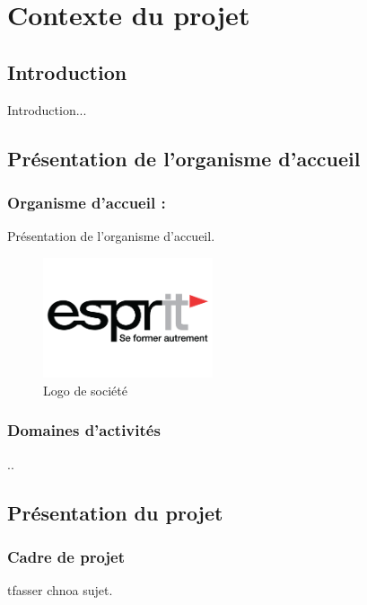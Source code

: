 
\chapter{Contexte du projet}


\setcounter{chapter}{1}
\minitoc


\section{Introduction}
Introduction...\\


\section{Présentation de l'organisme d'accueil }
\subsection{Organisme d'accueil : }
Présentation de l'organisme d'accueil.\\

\begin{figure}[h!]
	\centering
	\includegraphics[width=5cm]{resources/images/logo.png}
	\caption{Logo de société}
	\label{imag1}
\end{figure}


\subsection{Domaines d'activités}
..\\


\section{Présentation du projet}
\subsection{Cadre de projet}
tfasser chnoa sujet.\\
